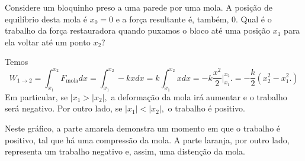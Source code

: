\documentclass[PhysicsI/physics_notes.tex]{subfiles}
\begin{document}
\begin{example}
	Considere um bloquinho preso a uma parede por uma mola. A posição de equilíbrio
	desta mola é \(x_{0}=0\) e a força resultante é, também, 0. Qual é o trabalho
	da força restauradora quando puxamos o bloco até uma posição \(x_{1}\) para ela
	voltar até um ponto \(x_{2}\)?

	Temos
	\[
		W_{1\rightarrow 2} = \int_{x_1}^{x_2}F_{\text{mola}}dx = \int_{x_1}^{x_2} -kxdx =
		k \int_{x_1}^{x_2}xdx = -k \frac{x^{2}}{2}\biggl|_{x_1}^{x_2}\biggr. = -\frac{k}{2}(x_{2}^{2} - x_{1}^{2}.)
	\]
	Em particular, se \(|x_{1} > |x_{2}|,\) a deformação da mola irá aumentar e o trabalho será negativo.
	Por outro lado, se \(|x_{1}| < |x_{2}|, \) o trabalho é positivo.

	Neste gráfico, a parte amarela demonstra um momento em que o trabalho é positivo,
	tal que há uma compressão da mola. A parte laranja, por outro lado, representa um
	trabalho negativo e, assim, uma distenção da mola.
\end{example}
\end{document}

